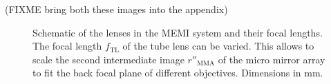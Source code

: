 (FIXME bring both these images into the appendix)

\begin{figure}[!htbp]
  \centering
  \caption{Schematic of the lenses in the MEMI system and their focal
    lengths. The focal length $f_\textrm{TL}$ of the tube lens can be
    varied. This allows to scale the second intermediate image
    $r''_\textrm{MMA}$ of the micro mirror array to fit the back
    focal plane of different objectives. Dimensions in mm.}
  \label{fig:memi-sketch}
\end{figure}





